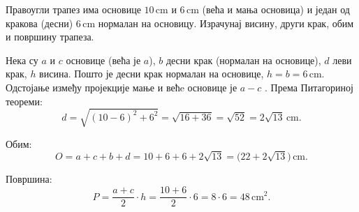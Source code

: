 \documentclass[11pt,a5paper,twoside,addpoints,noanswers]{exam} %
\newcommand{\measure}[2]{#1\,\mathrm{#2}}
\newcommand{\variant}[4]{#1}
\begin{document}
\begin{questions}
\question[5] %
Правоугли трапез има основице
$\measure{\variant{10}{12}{14}{16}}{cm}$ и
$\measure{\variant{6}{8}{9}{10}}{cm}$
(већа и мања основица) и један од кракова (десни)
$\measure{\variant{6}{5}{8}{6}}{cm}$ нормалан на основицу.
Израчунај висину, други крак, обим и површину трапеза.

\begin{solution}[\stretch 4]
Нека су $a$ и $c$ основице (већа је $a$), $b$ десни крак (нормалан на основице), $d$ леви крак, $h$ висина. Пошто је десни крак нормалан на основице, $h=b=\measure{\variant{6}{5}{8}{6}}{cm}$. Одстојање између пројекције мање и већe основице је
$a-c$%
. Према Питагориној теореми:
\[
	d = \sqrt{
		(
			\variant{10}{12}{14}{16} -
			\variant{6}{8}{9}{10}
		)^2 + \variant{6}{5}{8}{6}^2
	} = \sqrt{
		\variant{16}{16}{25}{36} + \variant{36}{25}{64}{36}
	} = \sqrt{\variant{52}{\measure{41}{cm}}{\measure{91}{cm}}{72}}
	\variant{= \measure{2 \sqrt{13}}{cm}}
	{}{}{= \measure{6 \sqrt{2}}{cm}}.
\]

Обим:
$$
	O = a + c + b + d
	= \variant{10}{12}{14}{16}
	+ \variant{6}{8}{9}{10}
	+ \variant{6}{5}{8}{6}
	+ \variant{2 \sqrt{13}}{\sqrt{41}}{\sqrt{91}}{6 \sqrt{2}}
	= \measure{
		\big(
			\variant{22}{25}{31}{32}
			+ \variant{2 \sqrt{13}}{\sqrt{41}}{\sqrt{91}}{6 \sqrt{2}}
		\big)
	}{cm}.
$$

Површина:
$$
	P = \frac{a+c}{2}\cdot h
	= \frac{
		\variant{10}{12}{14}{16} +
		\variant{6}{8}{9}{10}
	}{2} \cdot \variant{6}{5}{8}{6}
	= \variant{8}{10}{23}{13} \cdot \variant{6}{5}{4}{6}
	= \measure{\variant{48}{50}{92}{78}}{cm^2}.
$$
\end{solution}

\end{questions}
\end{document}
